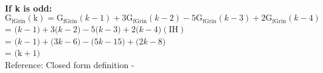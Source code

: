 \documentclass{article}
\begin{document}
    \\\textbf{If k is odd:}
    \\\indent\indent$\mathrm{G}_{\text{fGrin}}(\mathrm{k})=\mathrm{G}_{\text{fGrin}}(k-1)+3 \mathrm{G}_{\text{fGrin}}(k-2)-5 \mathrm{G}_{\text{fGrin}}(k-3)+2 \mathrm{G}_{\text{fGrin}}(k-4)$
    \\\indent\indent\indent\indent\indent= $\mathrm(k-1)+3 \mathrm(k-2)-5 \mathrm(k-3)+2 \mathrm(k-4)(\mathrm{IH})$
    \\\indent\indent\indent\indent\indent= $\mathrm(k-1)+\mathrm(3 k-6)-\mathrm(5 k-15)+\mathrm(2 k-8)$
    \\\indent\indent\indent\indent\indent= $\mathrm(\mathrm{k}+1)$
    \\Reference: Closed form definition - 
\end{document}
